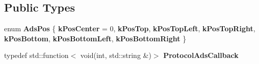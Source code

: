 \subsection*{Public Types}
\begin{DoxyCompactItemize}
\item 
\mbox{\label{classcocos2d_1_1plugin_1_1ProtocolAds_a17d340ca67ac512bb617f2f1bf4982fa}} 
enum {\bfseries Ads\+Pos} \{ \newline
{\bfseries k\+Pos\+Center} = 0, 
{\bfseries k\+Pos\+Top}, 
{\bfseries k\+Pos\+Top\+Left}, 
{\bfseries k\+Pos\+Top\+Right}, 
\newline
{\bfseries k\+Pos\+Bottom}, 
{\bfseries k\+Pos\+Bottom\+Left}, 
{\bfseries k\+Pos\+Bottom\+Right}
 \}
\item 
\mbox{\label{classcocos2d_1_1plugin_1_1ProtocolAds_a23d0880327ba9f3c178ea33efc93a824}} 
typedef std\+::function$<$ void(int, std\+::string \&)$>$ {\bfseries Protocol\+Ads\+Callback}
\end{DoxyCompactItemize}
